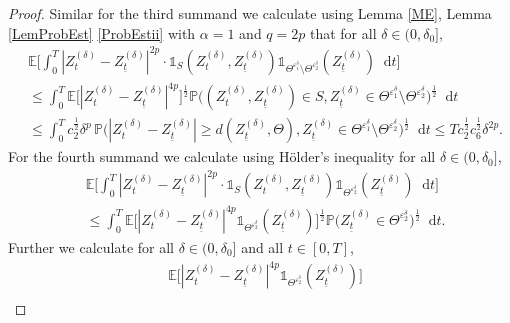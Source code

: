 \documentclass[11pt,a4paper]{article}
\numberwithin{equation}{section}
\theoremstyle{definition}
\newcommand{\E}{{\mathbb{E}}}
\renewcommand{\P}{{\mathbb{P}}}
\newcommand{\diff}{\mathop{}\!\mathrm{d}}
\begin{document}
\begin{proof}
    Similar for the third summand we calculate using Lemma \ref{ME}, Lemma \ref{LemProbEst} \ref{ProbEstii} with $\alpha=1$ and $q=2p$ that for all $\delta\in(0,\delta_0]$,
    \begin{equation}
        \begin{aligned}
            &\E\Big[\int_0^T  |Z_{t}^{(\delta)} - Z_{\underline t}^{(\delta)}|^{2p}\cdot \mathds{1}_{S}(Z_{t}^{(\delta)},Z_{\underline t}^{(\delta)}) \mathds{1}_{\Theta^{\varepsilon_1^\delta}\setminus \Theta^{\varepsilon_2^\delta}}(Z_{\underline t}^{(\delta)}) \diff t \Big]\\
            &\leq \int_0^T \E\Big[  |Z_{t}^{(\delta)} - Z_{\underline t}^{(\delta)}|^{4p}\Big]^\frac{1}{2} \P\Big( (Z_{t}^{(\delta)},Z_{\underline t}^{(\delta)}) \in S, Z_{\underline t}^{(\delta)} \in \Theta^{\varepsilon_1^\delta}\setminus \Theta^{\varepsilon_2^\delta}\Big)^{\frac{1}{2}} \diff t\\
            &\leq \int_0^T c_2^{\frac{1}{2}} \delta^p\, \P\Big(  |Z_{t}^{(\delta)}- Z_{\underline t}^{(\delta)}|\geq d(  Z_{\underline t}^{(\delta)}, \Theta), Z_{\underline t}^{(\delta)} \in \Theta^{\varepsilon_1^\delta}\setminus \Theta^{\varepsilon_2^\delta}\Big)^{\frac{1}{2}} \diff t
            \leq T c_2^{\frac{1}{2}} c_6^{\frac{1}{2}} \delta^{2p}.
        \end{aligned} 
    \end{equation}
    For the fourth summand we calculate using Hölder's inequality for all $\delta\in(0,\delta_0]$,
    \begin{equation}\label{ExepSeteq41}
        \begin{aligned}
            &\E\Big[\int_0^T  |Z_{t}^{(\delta)} - Z_{\underline t}^{(\delta)}|^{2p}\cdot \mathds{1}_{S}(Z_{t}^{(\delta)},Z_{\underline t}^{(\delta)}) \mathds{1}_{\Theta^{\varepsilon_2^\delta}}(Z_{\underline t}^{(\delta)}) \diff t \Big]\\
            &\leq \int_0^T \E\Big[  |Z_{t}^{(\delta)} - Z_{\underline t}^{(\delta)}|^{4p} \mathds{1}_{\Theta^{\varepsilon_2^\delta}}(Z_{\underline t}^{(\delta)})\Big]^\frac{1}{2} \P\big(  Z_{\underline t}^{(\delta)} \in \Theta^{\varepsilon_2^\delta}\big)^{\frac{1}{2}} \diff t.
        \end{aligned} 
    \end{equation}
    Further we calculate for all $\delta\in(0,\delta_0]$ and all $t\in[0,T]$,
    \begin{equation}\label{ExepSeteq42}
        \begin{aligned}
            &\E\Big[  |Z_{t}^{(\delta)} - Z_{\underline t}^{(\delta)}|^{4p} \mathds{1}_{\Theta^{\varepsilon_2^\delta}}(Z_{\underline t}^{(\delta)})\Big]\\

\end{aligned}
\end{equation}
\end{proof}
\end{document}
